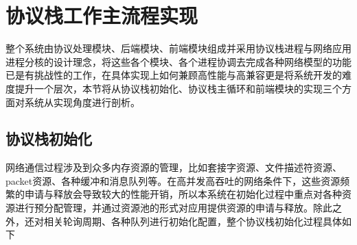 \section{协议栈工作主流程实现}

整个系统由协议处理模块、后端模块、前端模块组成并采用协议栈进程与网络应用进程分核的设计理念，将这些各个模块、各个进程协调去完成各种网络模型的功能已是有挑战性的工作，在具体实现上如何兼顾高性能与高兼容更是将系统开发的难度提升一个层次，本节将从协议栈初始化、协议栈主循环和前端模块的实现三个方面对系统从实现角度进行剖析。

\subsection{协议栈初始化}
网络通信过程涉及到众多内存资源的管理，比如套接字资源、文件描述符资源、packet资源、各种缓冲和消息队列等。在高并发高吞吐的网络条件下，这些资源频繁的申请与释放会导致较大的性能开销，所以本系统在初始化过程中重点对各种资源进行预分配管理，并通过资源池的形式对应用提供资源的申请与释放。除此之外，还对相关轮询周期、各种队列进行初始化配置，整个协议栈初始化过程具体如下
